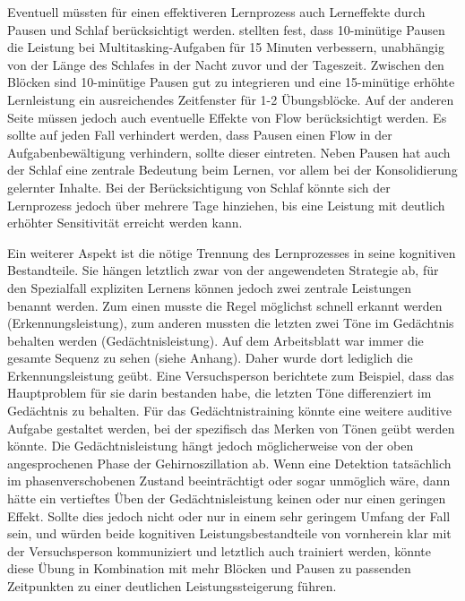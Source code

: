 \documentclass[doc,a4paper,12pt]{apa6}
\begin{document}
Eventuell müssten für einen effektiveren Lernprozess auch Lerneffekte durch Pausen und Schlaf berücksichtigt werden. \textcite{sallinen2008recovery} stellten fest, dass 10-minütige Pausen die Leistung bei Multitasking-Aufgaben für 15 Minuten verbessern, unabhängig von der Länge des Schlafes in der Nacht zuvor und der Tageszeit. Zwischen den Blöcken sind 10-minütige Pausen gut zu integrieren und eine 15-minütige erhöhte Lernleistung ein ausreichendes Zeitfenster für 1-2 Übungsblöcke. Auf der anderen Seite müssen jedoch auch eventuelle Effekte von Flow \parencite{nakamura2002concept} berücksichtigt werden. Es sollte auf jeden Fall verhindert werden, dass Pausen einen Flow in der Aufgabenbewältigung verhindern, sollte dieser eintreten. Neben Pausen hat auch der Schlaf \parencite{diekelmann2010memory} eine zentrale Bedeutung beim Lernen, vor allem bei der Konsolidierung gelernter Inhalte. Bei der Berücksichtigung von Schlaf könnte sich der Lernprozess jedoch über mehrere Tage hinziehen, bis eine Leistung mit deutlich erhöhter Sensitivität erreicht werden kann.

Ein weiterer Aspekt ist die nötige Trennung des Lernprozesses in seine kognitiven Bestandteile. Sie hängen letztlich zwar von der angewendeten Strategie ab, für den Spezialfall expliziten Lernens können jedoch zwei zentrale Leistungen benannt werden. Zum einen musste die Regel möglichst schnell erkannt werden (Erkennungsleistung), zum anderen mussten die letzten zwei Töne im Gedächtnis behalten werden (Gedächtnisleistung). Auf dem Arbeitsblatt war immer die gesamte Sequenz zu sehen (siehe Anhang). Daher wurde dort lediglich die Erkennungsleistung geübt. Eine Versuchsperson berichtete zum Beispiel, dass das Hauptproblem für sie darin bestanden habe, die letzten Töne differenziert im Gedächtnis zu behalten. Für das Gedächtnistraining könnte eine weitere auditive Aufgabe gestaltet werden, bei der spezifisch das Merken von Tönen geübt werden könnte. Die Gedächtnisleistung hängt jedoch möglicherweise von der oben angesprochenen Phase der Gehirnoszillation ab. Wenn eine Detektion tatsächlich im phasenverschobenen Zustand beeinträchtigt oder sogar unmöglich wäre, dann hätte ein vertieftes Üben der Gedächtnisleistung keinen oder nur einen geringen Effekt. Sollte dies jedoch nicht oder nur in einem sehr geringem Umfang der Fall sein, und würden beide kognitiven Leistungsbestandteile von vornherein klar mit der Versuchsperson kommuniziert und letztlich auch trainiert werden, könnte diese Übung in Kombination mit mehr Blöcken und Pausen zu passenden Zeitpunkten zu einer deutlichen Leistungssteigerung führen.
\end{document}
